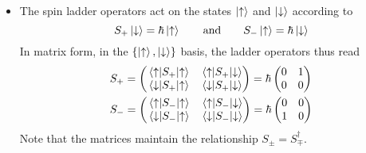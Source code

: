 \documentclass[11pt, a4paper]{article}
\newcommand{\eqtext}[1]{\qquad \text{#1} \qquad}
\newcommand{\ua}{\uparrow}  %
\newcommand{\da}{\downarrow}  %
\begin{document}
\begin{itemize}
	\item The spin ladder operators act on the states $ \ket{\ua} $ and $ \ket{\da} $ according to
	\begin{equation*}
		S_{+}\ket{\da} = \hbar \ket{\ua} \eqtext{and} S_{-}\ket{\ua} = \hbar \ket{\da}
	\end{equation*}
	In matrix form, in the $ \{\ket{\ua}, \ket{\da}\} $ basis, the ladder operators thus read
	\begin{align*}
		&S_{+} = 
		\begin{pmatrix}
			\mel{\ua}{S_{+}}{\ua} & \mel{\ua}{S_{+}}{\da}\\
			\mel{\da}{S_{+}}{\ua} & \mel{\da}{S_{+}}{\da}
		\end{pmatrix}
		= \hbar
		\begin{pmatrix}
			0 & 1\\
			0 & 0
		\end{pmatrix}\\
		&S_{-} = 
		\begin{pmatrix}
			\mel{\ua}{S_{-}}{\ua} & \mel{\ua}{S_{-}}{\da}\\
			\mel{\da}{S_{-}}{\ua} & \mel{\da}{S_{-}}{\da}
		\end{pmatrix}
		= \hbar
		\begin{pmatrix}
			0 & 0 \\
			1 & 0
		\end{pmatrix}
	\end{align*}
	Note that the matrices maintain the relationship $ S_{\pm} = S_{\mp}^{\dagger} $.
	

\end{itemize}
\end{document}
